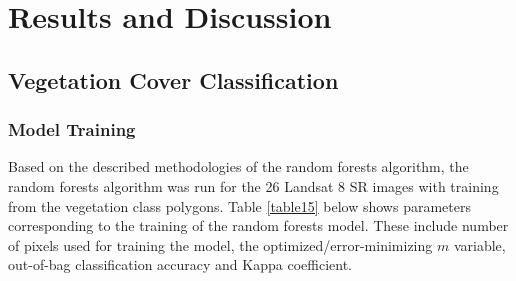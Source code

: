 \section{Results and Discussion}

\subsection{Vegetation Cover Classification}

\subsubsection{Model Training}

\justify
Based on the described methodologies of the random forests algorithm, the random forests algorithm was run for the 26 Landsat 8 SR images with training from the vegetation class polygons. Table \ref{table15} below shows parameters corresponding to the training of the random forests model. These include number of pixels used for training the model, the optimized/error-minimizing $m$ variable, out-of-bag classification accuracy and Kappa coefficient.

